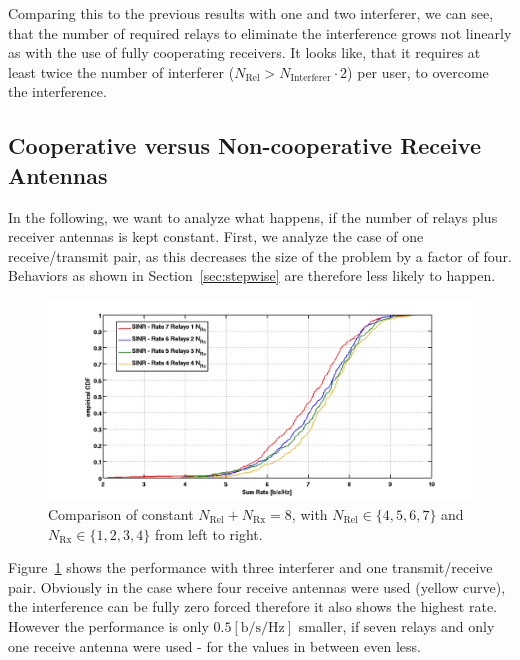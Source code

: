Comparing this to the previous results with one and two interferer, we can see, that  the number of required relays to eliminate the interference grows not linearly as with the use of fully cooperating receivers.
It looks like, that it requires at least twice the number of interferer ($N_\text{Rel} > N_\text{Interferer}\cdot2$) per user, to overcome the interference.

\subsection{Cooperative versus Non-cooperative Receive Antennas}
\label{sec:rel_rx_comp}

In the following, we want to analyze what happens, if the number of relays plus receiver antennas is kept constant.
First, we analyze the case of one receive/transmit pair, as this decreases the size of the problem by a factor of four.
Behaviors as shown in Section~\ref{sec:stepwise} are therefore less likely to happen.
\begin{figure}[h]
\centering
  \includegraphics[width=\linewidth]{images/ConstNrelNrx8comparison_1Rx_onlySINR.png}
\caption{Comparison of constant $N_\text{Rel} + N_{\text{Rx}} = 8$, with $N_\text{Rel}\in\{4,5,6,7\}$ and $N_{\text{Rx}}\in\{1,2,3,4\}$ from left to right.}
\label{fig:1user_const}
\end{figure}
Figure~\ref{fig:1user_const} shows the performance with three interferer and one transmit/receive pair.
Obviously in the case where four receive antennas were used (yellow curve), the interference can be fully zero forced therefore it also shows the highest rate.
However the performance is only $0.5 \left[\text{b/s/Hz}\right]$ smaller, if seven relays and only one receive antenna were used - for the values in between even less.
